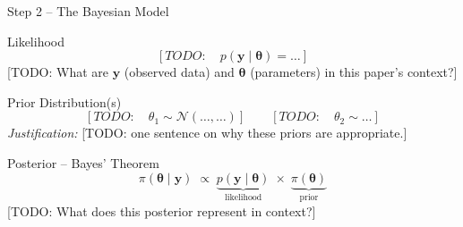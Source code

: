 \documentclass[aspectratio=169,11pt]{beamer}
\begin{document}
\begin{frame}{Step 2 -- The Bayesian Model}

  \begin{block}{Likelihood}
    \[
      [TODO:\quad p(\mathbf{y}\mid\boldsymbol{\theta}) = \ldots]
    \]
    \small
    [TODO: What are $\mathbf{y}$ (observed data) and
    $\boldsymbol{\theta}$ (parameters) in this paper's context?]
  \end{block}

  \vspace{3pt}

  \begin{block}{Prior Distribution(s)}
    \[
      [TODO:\quad\theta_1 \sim \mathcal{N}(\ldots,\ldots)]
      \qquad
      [TODO:\quad\theta_2 \sim \ldots]
    \]
    \small
    \textit{Justification:}
    [TODO: one sentence on why these priors are appropriate.]
  \end{block}

  \vspace{3pt}

  \begin{exampleblock}{Posterior -- Bayes' Theorem}
    \[
      \pi(\boldsymbol{\theta}\mid\mathbf{y})
      \;\propto\;
      \underbrace{p(\mathbf{y}\mid\boldsymbol{\theta})}_{\text{likelihood}}
      \;\times\;
      \underbrace{\pi(\boldsymbol{\theta})}_{\text{prior}}
    \]
    \small
    [TODO: What does this posterior represent in context?]
  \end{exampleblock}

\end{frame}
\end{document}
